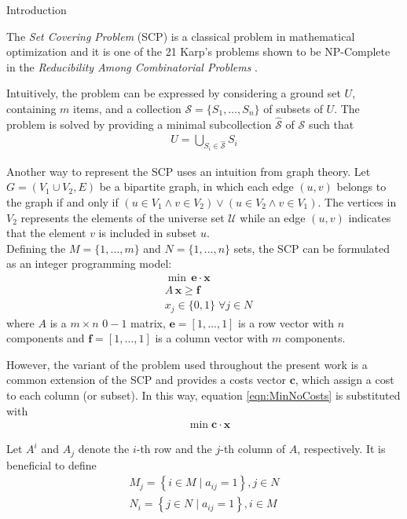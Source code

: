 \documentclass[a4paper,12pt]{mydeitesi_eng}
\begin{document}
\begin{chapter}{Introduction}
\label{chp:Introduction}

The \emph{Set Covering Problem} (SCP) is a classical problem in mathematical optimization and it is one of the 21 Karp's problems shown to be NP-Complete in the \emph{Reducibility Among Combinatorial Problems} \cite{Kar72}.

Intuitively, the problem can be expressed by considering a ground set $U$, containing $m$ items, and a collection $\mathcal{S} = \{S_1, \dots, S_n\}$ of subsets of $U$.
The problem is solved by providing a minimal subcollection $\mathcal{\hat{S}}$ of $\mathcal{S}$ such that
\begin{align}
U = \bigcup_{S_i \in \hat{\mathcal{S}}} S_i
\end{align}

Another way to represent the SCP uses an intuition from graph theory.
Let $G = \left(V_1 \cup V_2, E\right)$ be a bipartite graph, in which each edge $\left(u, v\right)$ belongs to the graph if and only if $\left(u \in V_1 \wedge v \in V_2\right)  \vee \left(u \in V_2 \wedge v \in V_1\right)$.
The vertices in $V_2$ represents the elements of the universe set $\mathcal{U}$ while an edge $\left(u, v\right)$ indicates that the element $v$ is included in subset $u$.\\

Defining the $M = \{1, \dots, m\}$ and $N = \{1, \dots, n\}$ sets, the SCP can be formulated as an integer programming model:
\begin{align}
	& \min \, \mathbf{e \cdot x} \label{eqn:MinNoCosts}\\
	& A \, \mathbf{x} \ge \mathbf{f} \label{eqn:PrimStart}\\
	& x_j \in \{0,1\} \; \forall j \in N
\end{align}
where $A$ is a $m \times n$ $0-1$ matrix, $\mathbf{e} = \left[1, \dots, 1\right]$ is a row vector with $n$ components and $\mathbf{f} = \left[1, \dots, 1\right]$ is a column vector with $m$ components.

However, the variant of the problem used throughout the present work is a common extension of the SCP and provides a costs vector $\mathbf{c}$, which assign a cost to each column (or subset).
In this way, equation \ref{eqn:MinNoCosts} is substituted with
\begin{align}
	& \min \mathbf{c \cdot x} \label{eqn:MinWithCosts}
\end{align}

Let $A^i$ and $A_j$ denote the $i$-th row and the $j$-th column of $A$, respectively.
It is beneficial to define
\begin{align}
	M_j = \left\{ i \in M \mid a_{ij} = 1 \right\}, j \in N \\
	N_i = \left\{ j \in N \mid a_{ij} = 1 \right\}, i \in M
\end{align}


\end{chapter}
\end{document}
